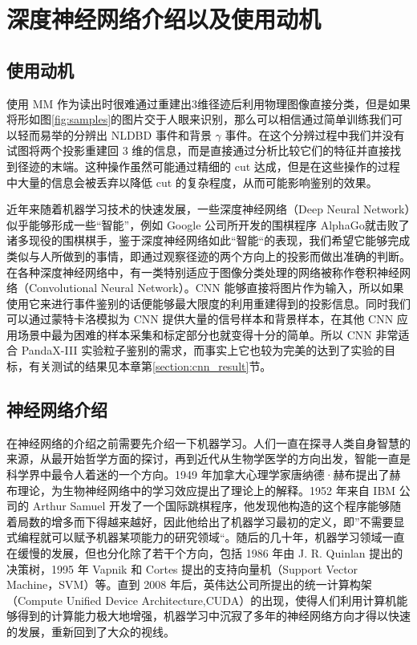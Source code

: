 \section{深度神经网络介绍以及使用动机}

\subsection{使用动机}

使用 MM 作为读出时很难通过重建出3维径迹后利用物理图像直接分类，但是如果将形如图\ref{fig:samples}的图片交于人眼来识别，那么可以相信通过简单训练我们可以轻而易举的分辨出 NLDBD 事件和背景 $\gamma$ 事件。在这个分辨过程中我们并没有试图将两个投影重建回 3 维的信息，而是直接通过分析比较它们的特征并直接找到径迹的末端。这种操作虽然可能通过精细的 cut 达成，但是在这些操作的过程中大量的信息会被丢弃以降低 cut 的复杂程度，从而可能影响鉴别的效果。

近年来随着机器学习技术的快速发展，一些深度神经网络（Deep Neural Network）似乎能够形成一些“智能”，例如 Google 公司所开发的围棋程序 AlphaGo\supercite{gibney2016google}就击败了诸多现役的围棋棋手，鉴于深度神经网络如此“智能“的表现，我们希望它能够完成类似与人所做到的事情，即通过观察径迹的两个方向上的投影而做出准确的判断。在各种深度神经网络中，有一类特别适应于图像分类处理的网络被称作卷积神经网络（Convolutional Neural Network）。CNN 能够直接将图片作为输入，所以如果使用它来进行事件鉴别的话便能够最大限度的利用重建得到的投影信息。同时我们可以通过蒙特卡洛模拟为 CNN 提供大量的信号样本和背景样本，在其他 CNN 应用场景中最为困难的样本采集和标定部分也就变得十分的简单。所以 CNN 非常适合 PandaX-III 实验粒子鉴别的需求，而事实上它也较为完美的达到了实验的目标，有关测试的结果见本章第\ref{section:cnn_result}节。

\subsection{神经网络介绍}

在神经网络的介绍之前需要先介绍一下机器学习。人们一直在探寻人类自身智慧的来源，从最开始哲学方面的探讨，再到近代从生物学医学的方向出发，智能一直是科学界中最令人着迷的一个方向。1949 年加拿大心理学家唐纳德·赫布提出了赫布理论\supercite{hebbian}，为生物神经网络中的学习效应提出了理论上的解释。1952 年来自 IBM 公司的 Arthur Samuel 开发了一个国际跳棋程序，他发现他构造的这个程序能够随着局数的增多而下得越来越好，因此他给出了机器学习最初的定义，即”不需要显式编程就可以赋予机器某项能力的研究领域“。随后的几十年，机器学习领域一直在缓慢的发展，但也分化除了若干个方向，包括 1986 年由 J. R. Quinlan 提出的决策树，1995 年 Vapnik 和 Cortes 提出的支持向量机（Support Vector Machine，SVM）等\supercite{mlhistory}。直到 2008 年后，英伟达公司所提出的统一计算构架（Compute Unified Device Architecture,CUDA）\supercite{CUDA}的出现，使得人们利用计算机能够得到的计算能力极大地增强，机器学习中沉寂了多年的神经网络方向才得以快速的发展，重新回到了大众的视线。

